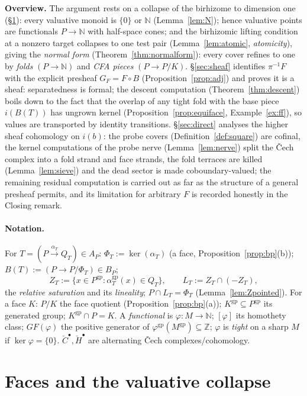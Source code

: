 \documentclass[11pt]{article}
\theoremstyle{definition}
\newcommand{\gp}{\mathrm{gp}}
\newcommand{\HH}{\check{H}}
\newcommand{\cC}{\check{C}}
\newcommand{\Z}{\mathbb{Z}}
\begin{document}
\noindent\textbf{Overview.}
The argument rests on a collapse of the birhizome to dimension one
(\S\ref{sec:collapse}): every valuative monoid is $\{0\}$ or $\mathbb N$
(Lemma~\ref{lem:N}); hence valuative points are functionals
$P\to\mathbb N$ with half-space cones; and the birhizomic lifting
condition at a nonzero target collapses to one test pair
(Lemma~\ref{lem:atomic}, \emph{atomicity}), giving the \emph{normal
form} (Theorem~\ref{thm:normalform}): every cover refines to one by
\emph{folds} $(P\to\mathbb N)$ and \emph{CFA pieces} $(P\to P/K)$.
\S\ref{sec:sheaf} identifies $\pi^{-1}F$ with the explicit presheaf
$G_F=F\circ B$ (Proposition~\ref{prop:adj}) and proves it is a sheaf:
separatedness is formal; the descent computation
(Theorem~\ref{thm:descent}) boils down to the fact that the overlap of
any tight fold with the base piece $i(B(T))$ has ungrown kernel
(Proposition~\ref{prop:equiface}, Example~\ref{ex:ff}), so values are
transported by identity transitions. \S\ref{sec:direct} analyses the
higher sheaf cohomology on $i(b)$: the probe covers
(Definition~\ref{def:square}) are cofinal, the kernel computations of
the probe nerve (Lemma~\ref{lem:nerve}) split the \v{C}ech complex
into a fold strand and face strands, the fold terraces are killed
(Lemma~\ref{lem:sieve}) and the dead sector is made coboundary-valued;
the remaining residual computation is carried out as far as the
structure of a general presheaf permits, and its limitation for
arbitrary $F$ is recorded honestly in the Closing remark.

\paragraph{Notation.} For $T=(P\xrightarrow{\alpha_T}Q_T)\in A_P$:
$\Phi_T:=\ker(\alpha_T)$ (a face, Proposition~\ref{prop:bp}(b));
$B(T):=(P\to P/\Phi_T)\in B_P$;
\[
Z_T:=\{x\in P^{\gp}:\alpha_T^{\gp}(x)\in Q_T\},\qquad
L_T:=Z_T\cap(-Z_T),
\]
the \emph{relative saturation} and its \emph{lineality};
$P\cap L_T=\Phi_T$ (Lemma~\ref{lem:Zpointed}). For a face $K$: $P/K$
the face quotient (Proposition~\ref{prop:bp}(a));
$K^{\gp}\subseteq P^{\gp}$ its generated group; $K^{\gp}\cap P=K$.
A \emph{functional} is $\varphi:M\to\mathbb N$; $[\varphi]$ its
homothety class; ${GF}(\varphi)$ the positive generator of
$\varphi^{\gp}(M^{\gp})\subseteq\Z$; $\varphi$ is \emph{tight} on a
sharp $M$ if $\ker\varphi=\{0\}$. $\cC^\bullet,\HH^\bullet$ are
alternating \v{C}ech complexes/cohomology.

\section{Faces and the valuative collapse}\label{sec:collapse}
\end{document}

